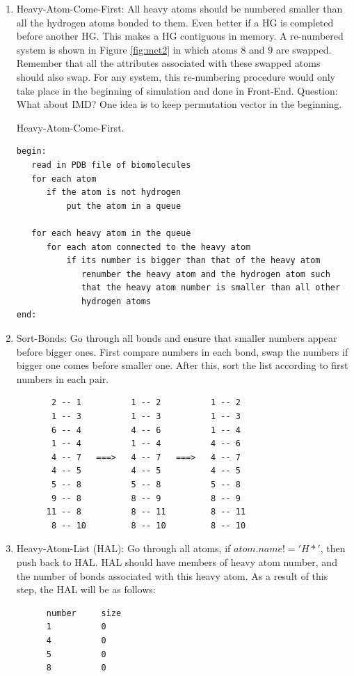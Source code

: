 \documentclass[11pt]{article}
\begin{document}
\begin{enumerate}
\label{HACF}
\item Heavy-Atom-Come-First: All heavy atoms should be numbered
smaller than all the hydrogen atoms bonded to them. Even better if a
HG is completed before another HG. This makes a HG contiguous in memory.
A re-numbered system is shown in Figure \ref{fig:met2} in which atoms
$8$ and $9$ are swapped. Remember that all the attributes associated
with these swapped atoms should also swap. For any system, this
re-numbering procedure would only take place in the beginning of
simulation and done in Front-End. Question: What about IMD? One idea
is to keep permutation vector in the beginning. 
\begin{algorithm}
\caption{ Heavy-Atom-Come-First.}
\begin{verbatim}
begin:	
   read in PDB file of biomolecules
   for each atom 
      if the atom is not hydrogen
          put the atom in a queue  

   for each heavy atom in the queue
      for each atom connected to the heavy atom
          if its number is bigger than that of the heavy atom
             renumber the heavy atom and the hydrogen atom such 
             that the heavy atom number is smaller than all other 
             hydrogen atoms
end:
\end{verbatim}
\end{algorithm}


\item Sort-Bonds: Go through all bonds and ensure that smaller numbers 
appear before bigger ones. First compare numbers in each bond, swap
the numbers if bigger one comes before smaller one. After this, sort
the list according to first numbers in each pair. 
\begin{verbatim}
       2 -- 1          1 -- 2          1 -- 2
       1 -- 3          1 -- 3          1 -- 3
       6 -- 4          4 -- 6          1 -- 4
       1 -- 4          1 -- 4          4 -- 6
       4 -- 7   ===>   4 -- 7   ===>   4 -- 7
       4 -- 5          4 -- 5          4 -- 5
       5 -- 8          5 -- 8          5 -- 8
       9 -- 8          8 -- 9          8 -- 9
      11 -- 8          8 -- 11         8 -- 11
       8 -- 10         8 -- 10         8 -- 10
\end{verbatim}

\item Heavy-Atom-List (HAL): Go through all atoms, if $atom.name!='H*'$,
then push back to HAL. HAL should have members of heavy atom number,
and the number of bonds associated with this heavy atom. As a result
of this step, the HAL will be as follows:
\begin{verbatim}
      number     size
      1          0
      4          0
      5          0
      8          0
\end{verbatim}


\end{enumerate}
\end{document}
